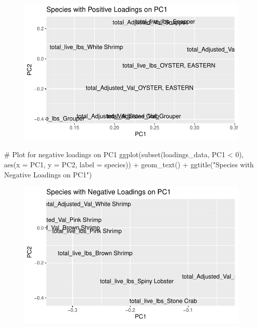 \documentclass[
  letterpaper,
  DIV=11,
  numbers=noendperiod]{scrartcl}
\newenvironment{Shaded}{\begin{snugshade}}{\end{snugshade}}
\newcommand{\AttributeTok}[1]{\textcolor[rgb]{0.40,0.45,0.13}{#1}}
\newcommand{\CommentTok}[1]{\textcolor[rgb]{0.37,0.37,0.37}{#1}}
\newcommand{\DecValTok}[1]{\textcolor[rgb]{0.68,0.00,0.00}{#1}}
\newcommand{\FunctionTok}[1]{\textcolor[rgb]{0.28,0.35,0.67}{#1}}
\newcommand{\NormalTok}[1]{\textcolor[rgb]{0.00,0.23,0.31}{#1}}
\newcommand{\SpecialCharTok}[1]{\textcolor[rgb]{0.37,0.37,0.37}{#1}}
\newcommand{\StringTok}[1]{\textcolor[rgb]{0.13,0.47,0.30}{#1}}
\begin{document}
\begin{figure}[H]

{\centering \includegraphics{PCA_all_data_files/figure-pdf/unnamed-chunk-8-1.pdf}

}

\end{figure}

\begin{Shaded}
\begin{Highlighting}[]
\CommentTok{\# Plot for negative loadings on PC1}
\FunctionTok{ggplot}\NormalTok{(}\FunctionTok{subset}\NormalTok{(loadings\_data, PC1 }\SpecialCharTok{\textless{}} \DecValTok{0}\NormalTok{), }\FunctionTok{aes}\NormalTok{(}\AttributeTok{x =}\NormalTok{ PC1, }\AttributeTok{y =}\NormalTok{ PC2, }\AttributeTok{label =}\NormalTok{ species)) }\SpecialCharTok{+}
  \FunctionTok{geom\_text}\NormalTok{() }\SpecialCharTok{+}
  \FunctionTok{ggtitle}\NormalTok{(}\StringTok{"Species with Negative Loadings on PC1"}\NormalTok{)}
\end{Highlighting}
\end{Shaded}

\begin{figure}[H]

{\centering \includegraphics{PCA_all_data_files/figure-pdf/unnamed-chunk-8-2.pdf}

}

\end{figure}
\end{document}
